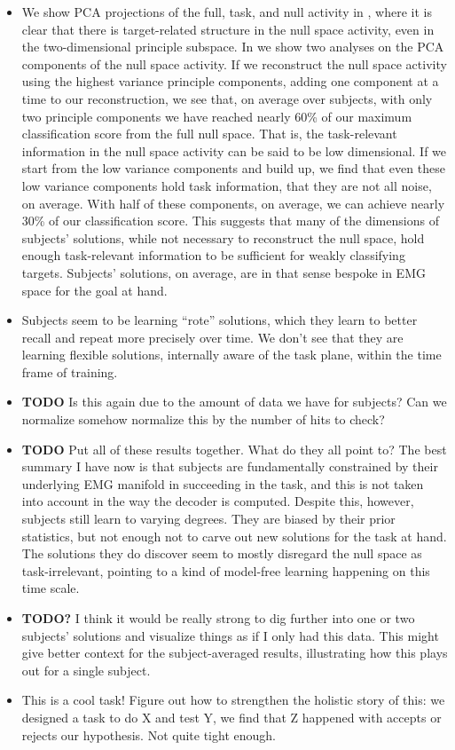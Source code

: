 \documentclass[../main.tex]{subfiles}
\begin{document}
\begin{itemize}
  \item We show PCA projections of the full, task, and null activity in , where it is clear that there is target-related structure in the null space activity, even in the two-dimensional principle subspace. In  we show two analyses on the PCA components of the null space activity. If we reconstruct the null space activity using the highest variance principle components, adding one component at a time to our reconstruction, we see that, on average over subjects, with only two principle components we have reached nearly 60\% of our maximum classification score from the full null space. That is, the task-relevant information in the null space activity can be said to be low dimensional. If we start from the low variance components and build up, we find that even these low variance components hold task information, that they are not all noise, on average. With half of these components, on average, we can achieve nearly 30\% of our classification score. This suggests that many of the dimensions of subjects' solutions, while not necessary to reconstruct the null space, hold enough task-relevant information to be sufficient for weakly classifying targets. Subjects' solutions, on average, are in that sense bespoke in EMG space for the goal at hand.
  \item Subjects seem to be learning ``rote'' solutions, which they learn to better recall and repeat more precisely over time. We don't see that they are learning flexible solutions, internally aware of the task plane, within the time frame of training.
  \item \textbf{TODO} Is this again due to the amount of data we have for subjects? Can we normalize somehow normalize this by the number of hits to check?
  \item \textbf{TODO} Put all of these results together. What do they all point to? The best summary I have now is that subjects are fundamentally constrained by their underlying EMG manifold in succeeding in the task, and this is not taken into account in the way the decoder is computed. Despite this, however, subjects still learn to varying degrees. They are biased by their prior statistics, but not enough not to carve out new solutions for the task at hand. The solutions they do discover seem to mostly disregard the null space as task-irrelevant, pointing to a kind of model-free learning happening on this time scale.
  \item \textbf{TODO?} I think it would be really strong to dig further into one or two subjects' solutions and visualize things as if I only had this data. This might give better context for the subject-averaged results, illustrating how this plays out for a single subject.
  \item This is a cool task! Figure out how to strengthen the holistic story of this: we designed a task to do X and test Y, we find that Z happened with accepts or rejects our hypothesis. Not quite tight enough.
\end{itemize}
\end{document}
